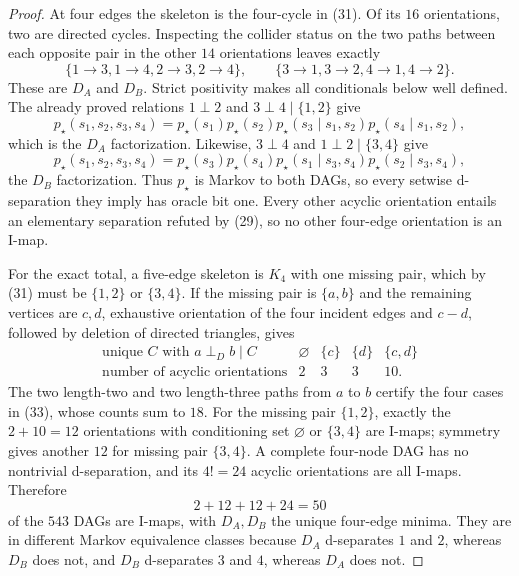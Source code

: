 \documentclass{article}
\begin{document}
\begin{proof}
At four edges the skeleton is the four-cycle in (31).  Of its \(16\) orientations, two are directed cycles.  Inspecting the collider status on the two paths between each opposite pair in the other \(14\) orientations leaves exactly
\[
 \{1\to3,1\to4,2\to3,2\to4\},
 \qquad
 \{3\to1,3\to2,4\to1,4\to2\}. \tag{32}
\]
These are \(D_A\) and \(D_B\).  Strict positivity makes all conditionals below well defined.  The already proved relations \(1\perp2\) and \(3\perp4\mid\{1,2\}\) give
\[
 p_\star(s_1,s_2,s_3,s_4)
 =p_\star(s_1)p_\star(s_2)
  p_\star(s_3\mid s_1,s_2)p_\star(s_4\mid s_1,s_2),
\]
which is the \(D_A\) factorization.  Likewise, \(3\perp4\) and \(1\perp2\mid\{3,4\}\) give
\[
 p_\star(s_1,s_2,s_3,s_4)
 =p_\star(s_3)p_\star(s_4)
  p_\star(s_1\mid s_3,s_4)p_\star(s_2\mid s_3,s_4),
\]
the \(D_B\) factorization.  Thus \(p_\star\) is Markov to both DAGs, so every setwise d-separation they imply has oracle bit one.  Every other acyclic orientation entails an elementary separation refuted by (29), so no other four-edge orientation is an I-map.

For the exact total, a five-edge skeleton is \(K_4\) with one missing pair, which by (31) must be \(\{1,2\}\) or \(\{3,4\}\).  If the missing pair is \(\{a,b\}\) and the remaining vertices are \(c,d\), exhaustive orientation of the four incident edges and \(c-d\), followed by deletion of directed triangles, gives
\[
\begin{array}{c|rrrr}
\text{unique }C\text{ with }a\perp_D b\mid C
&\varnothing&\{c\}&\{d\}&\{c,d\}\\ \hline
\text{number of acyclic orientations}&2&3&3&10.
\end{array} \tag{33}
\]
The two length-two and two length-three paths from \(a\) to \(b\) certify the four cases in (33), whose counts sum to \(18\).  For the missing pair \(\{1,2\}\), exactly the \(2+10=12\) orientations with conditioning set \(\varnothing\) or \(\{3,4\}\) are I-maps; symmetry gives another \(12\) for missing pair \(\{3,4\}\).  A complete four-node DAG has no nontrivial d-separation, and its \(4!=24\) acyclic orientations are all I-maps.  Therefore
\[
 2+12+12+24=50 \tag{34}
\]
of the \(543\) DAGs are I-maps, with \(D_A,D_B\) the unique four-edge minima.  They are in different Markov equivalence classes because \(D_A\) d-separates \(1\) and \(2\), whereas \(D_B\) does not, and \(D_B\) d-separates \(3\) and \(4\), whereas \(D_A\) does not.


\end{proof}
\end{document}

